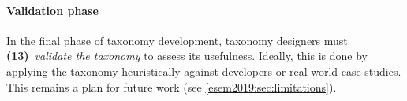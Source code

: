 \paragraph{Validation phase} In the final phase of taxonomy development, taxonomy designers must \textbf{(13)}~\textit{validate the taxonomy} to assess its usefulness. Ideally, this is done by applying the taxonomy heuristically against developers or real-world case-studies. This remains a plan for future work (see \cref{esem2019:sec:limitations}).


%
%  
